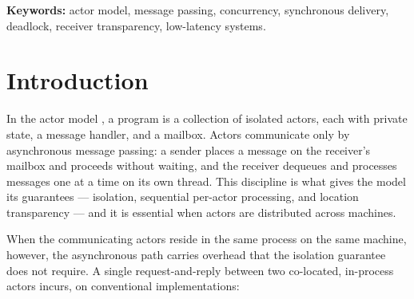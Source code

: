 \documentclass[11pt]{article}
\newcommand{\fs}{\texttt{fast\_send}}
\begin{document}
\begin{abstract}
We then measure the framework in a real HFT setting: socket-to-book
(``tick-to-book'') latency on a live CME market-data feed for ES, NQ, and ZN
futures, measured with software timestamps from socket read to book update. When
the socket-reader thread decodes each packet and updates the book itself,
book-update medians are $0.8$--$1.1~\mu$s, and a $\sim\!9$~ns \fs{} hop is about
$1\%$ of that. When the reader instead hands each datagram to a second thread
through an asynchronous mailbox, the median rises to $\sim\!7~\mu$s, and the
tail grows with in-packet position and, on rare bursts, mailbox-queue backlog,
driven by the market's non-Poisson, strongly clustered arrival process, which we
characterize in a companion paper. Finally, the shared-queue group yields a
production/simulation duality: the same actor code runs unchanged in live trading
and in deterministic backtest. A saturated-throughput and contention evaluation
is left to future work.
\end{abstract}

\vspace{0.5em}
\noindent\textbf{Keywords:} actor model, message passing, concurrency,
synchronous delivery, deadlock, receiver transparency, low-latency
systems.

\section{Introduction}

In the actor model \cite{hewitt1973,agha1986}, a program is a collection of
isolated actors, each with private state, a message handler, and a mailbox.
Actors communicate only by asynchronous message passing: a sender places a
message on the receiver's mailbox and proceeds without waiting, and the receiver
dequeues and processes messages one at a time on its own thread. This discipline
is what gives the model its guarantees --- isolation, sequential per-actor
processing, and location transparency --- and it is essential when actors are
distributed across machines.

When the communicating actors reside in the same process on the same machine,
however, the asynchronous path carries overhead that the isolation guarantee
does not require. A single request-and-reply between two co-located, in-process actors
incurs, on conventional implementations:
\end{document}
